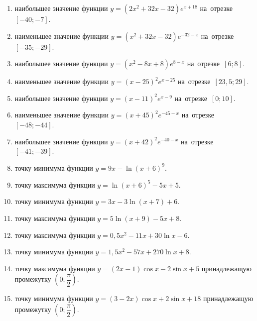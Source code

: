 \documentclass[a4paper,10pt]{article}
\begin{document}
\begin{enumerate}
\item {} наибольшее значение функции $y=\left(2x^2 +32x -32\right)e^{x+18}$ на~отрезке~$\left[-40;-7\right]$.

\item {} наименьшее значение функции $y=\left(x^2 +32x -32\right)e^{-32-x}$ на~отрезке~$\left[-35;-29\right]$.

\item {} наибольшее значение функции $y=\left(x^2 -8x +8\right)e^{8-x}$ на~отрезке~$\left[6;8\right]$.

\item {} наименьшее значение функции $y=\left(x-25\right)^2e^{x-25}$ на~отрезке~$\left[23,5;29\right]$.

\item {} наибольшее значение функции $y=\left(x-11\right)^2e^{x-9}$ на~отрезке~$\left[0;10\right]$.

\item {} наименьшее значение функции $y=\left(x+45\right)^2e^{-45-x}$ на~отрезке~$\left[-48;-44\right]$.

\item {} наибольшее значение функции $y=\left(x+42\right)^2e^{-40-x}$ на~отрезке~$\left[-41;-39\right]$.

\item {} точку минимума функции $y=9x-\ln\left(x+6\right)^{9}$.

\item {} точку максимума функции $y=\ln\left(x+6\right)^{5}-5x+5$.

\item {} точку минимума функции $y=3x-3\ln\left(x+7\right)+6$.

\item {} точку максимума функции $y=5\ln\left(x+9\right)-5x+8$.

\item {} точку максимума функции $y=0,5x^2-11x+30\ln x -6$.

\item {} точку минимума функции $y=1,5x^2-57x+270\ln x +8$.

\item {} точку максимума функции $y=\left(2x-1\right)\cos x -2\sin x+5$
принадлежащую промежутку $\left(0;\dfrac{\pi}{2}\right)$.

\item {} точку минимума функции $y=\left(3-2x\right)\cos x +2\sin x+18$
принадлежащую промежутку $\left(0;\dfrac{\pi}{2}\right)$.


\end{enumerate}
\end{document}
